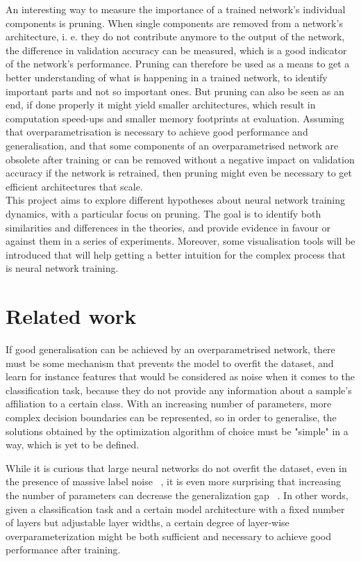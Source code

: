 An interesting way to measure the importance of a trained network's individual components is pruning. When single components are removed from a network's architecture, i. e. they do not contribute anymore to the output of the network, the difference in validation accuracy can be measured, which is a good indicator of the network's performance. Pruning can therefore be used as a means to get a better understanding of what is happening in a trained network, to identify important parts and not so important ones. But pruning can also be seen as an end, if done properly it might yield smaller architectures, which result in computation speed-ups and smaller memory footprints at evaluation. Assuming that overparametrisation is necessary to achieve good performance and generalisation, and that some components of an overparametrised network are obsolete after training or can be removed without a negative impact on validation accuracy if the network is retrained, then pruning might even be necessary to get efficient architectures that scale. \\

This project aims to explore different hypotheses about neural network training dynamics, with a particular focus on pruning. The goal is to identify both similarities and differences in the theories, and provide evidence in favour or against them in a series of experiments. Moreover, some visualisation tools will be introduced that will help getting a better intuition for the complex process that is neural network training.

\section{Related work}
If good generalisation can be achieved by an overparametrised network, there must be some mechanism that prevents the model to overfit the dataset, and learn for instance features that would be considered as noise when it comes to the classification task, because they do not provide any information about a sample's affiliation to a certain class. With an increasing number of parameters, more complex decision boundaries can be represented, so in order to generalise, the solutions obtained by the optimization algorithm of choice must be "simple" in a way, which is yet to be defined.

While it is curious that large neural networks do not overfit the dataset, even in the presence of massive label noise ~\autocite{rolnick2017deep}, it is even more surprising that increasing the number of parameters can decrease the generalization gap ~\autocite{neyshabur2018towards}. In other words, given a classification task and a certain model architecture with a fixed number of layers but adjustable layer widths, a certain degree of layer-wise overparameterization might be both sufficient and necessary to achieve good performance after training. 

